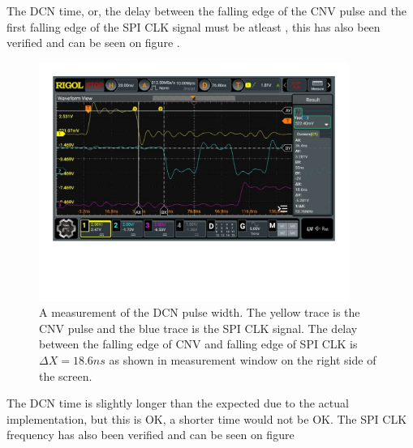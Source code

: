 The DCN time, or, the delay between the falling edge of the CNV pulse and the first falling edge of the SPI CLK signal must be atleast , this has also been verified and can be seen on figure .

\begin{figure}[H]
    \centering
    \includegraphics[clip, trim=0 150 0 0, width=0.9\textwidth]{Sections/7_SystemDesign/Figures/7_2_8_ADC_CONTROL_DCN_MEAS.pdf}
    \caption{A measurement of the DCN pulse width. The yellow trace is the CNV pulse and the blue trace is the SPI CLK signal. The delay between the falling edge of CNV and falling edge of SPI CLK is $\Delta X = 18.6 ns$ as shown in measurement window on the right side of the screen.}
    \label{fig:7_2_8_ADC_CONTROL_DCN_MEAS}
\end{figure}

The DCN time is slightly longer than the expected  due to the actual implementation, but this is OK, a shorter time would not be OK. The SPI CLK frequency has also been verified and can be seen on figure 

